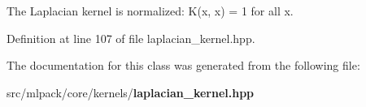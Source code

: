 The Laplacian kernel is normalized\-: K(x, x) = 1 for all x. 



Definition at line 107 of file laplacian\-\_\-kernel.\-hpp.



The documentation for this class was generated from the following file\-:\begin{DoxyCompactItemize}
\item 
src/mlpack/core/kernels/{\bf laplacian\-\_\-kernel.\-hpp}\end{DoxyCompactItemize}
